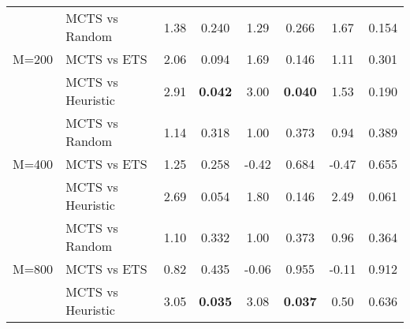 \begin{tabular}{llcccccc}
\midrule
\multirow{3}{*}{M=200} & MCTS vs Random  & 1.38   & 0.240           & 1.29       & 0.266              & 1.67     & 0.154            \\
                       & MCTS vs ETS     & 2.06   & 0.094           & 1.69       & 0.146              & 1.11     & 0.301            \\
                       & MCTS vs Heuristic & 2.91   & \textbf{0.042}  & 3.00       & \textbf{0.040}     & 1.53     & 0.190            \\
\midrule
\multirow{3}{*}{M=400} & MCTS vs Random  & 1.14   & 0.318           & 1.00       & 0.373              & 0.94     & 0.389            \\
                       & MCTS vs ETS     & 1.25   & 0.258           & -0.42      & 0.684              & -0.47    & 0.655            \\
                       & MCTS vs Heuristic & 2.69   & 0.054           & 1.80       & 0.146              & 2.49     & 0.061            \\
\midrule
\multirow{3}{*}{M=800} & MCTS vs Random  & 1.10   & 0.332           & 1.00       & 0.373              & 0.96     & 0.364            \\
                       & MCTS vs ETS     & 0.82   & 0.435           & -0.06      & 0.955              & -0.11    & 0.912            \\
                       & MCTS vs Heuristic & 3.05   & \textbf{0.035}  & 3.08       & \textbf{0.037}     & 0.50     & 0.636           \\
\bottomrule
\end{tabular}